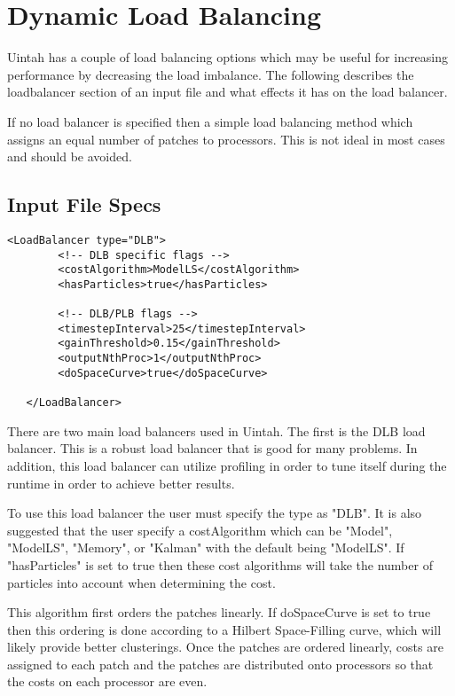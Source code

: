 \section{Dynamic Load Balancing}

Uintah has a couple of load balancing options which may be useful for increasing performance by decreasing
the load imbalance.  The following describes the loadbalancer section of an input file and what effects
it has on the load balancer.  

If no load balancer is specified then a simple load balancing method which assigns an equal number of patches
to processors. This is not ideal in most cases and should be avoided.

\subsection{Input File Specs}
\begin{Verbatim}[fontsize=\footnotesize]
   <LoadBalancer type="DLB"> 
        <!-- DLB specific flags -->
        <costAlgorithm>ModelLS</costAlgorithm>
        <hasParticles>true</hasParticles>

        <!-- DLB/PLB flags -->
        <timestepInterval>25</timestepInterval>
        <gainThreshold>0.15</gainThreshold>
        <outputNthProc>1</outputNthProc>
        <doSpaceCurve>true</doSpaceCurve>

   </LoadBalancer>
\end{Verbatim}

There are two main load balancers used in Uintah.  The first is the DLB load balancer.
This is a robust load balancer that is good for many problems.  In addition,
this load balancer can utilize profiling in order to tune itself during the runtime
in order to achieve better results.  

To use this load balancer the user must specify the type as "DLB".  It is also suggested
that the user specify a costAlgorithm which can be "Model", "ModelLS", "Memory", or
"Kalman" with the default being "ModelLS".  If "hasParticles" is set to true then
these cost algorithms will take the number of particles into account when determining
the cost.

This algorithm first orders the patches linearly.  If doSpaceCurve is set to true
then this ordering is done according to a Hilbert Space-Filling curve, which will
likely provide better clusterings.  Once the patches are ordered linearly, costs
are assigned to each patch and the patches are distributed onto processors so that
the costs on each processor are even.  


